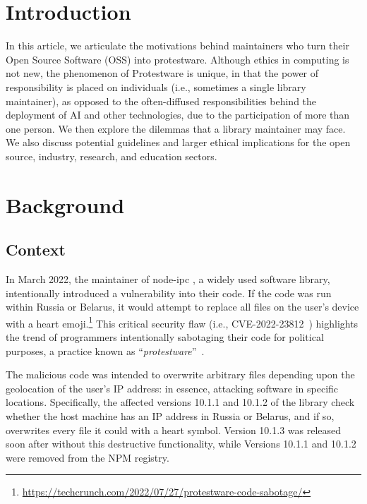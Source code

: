 \documentclass[journal,twocolumn]{IEEEtran}
\begin{document}
\section{Introduction}
In this article, we articulate the motivations behind maintainers who turn their Open Source Software (OSS) into protestware.
Although ethics in computing is not new, the phenomenon of Protestware is unique, in that the power of responsibility is placed on individuals (i.e., sometimes a single library maintainer), as opposed to the often-diffused responsibilities behind the deployment of AI and other technologies, due to the participation of more than one person.
We then explore the dilemmas that a library maintainer may face.
We also discuss potential guidelines and larger ethical implications for the open source, industry, research, and education sectors.

\section{Background}
\label{sec:background}
\subsection{Context}
\label{sec:context}

In March 2022, the maintainer of node-ipc \cite{Web:node-ipc}, a widely used software library, intentionally introduced a vulnerability into their code. If the code was run within Russia or Belarus, it would attempt to replace all files on the user's device with a heart emoji.\footnote{\url{https://techcrunch.com/2022/07/27/protestware-code-sabotage/}} This critical security flaw (i.e., CVE-2022-23812~\cite{Web:CVE-2022-23812}) highlights the trend of programmers intentionally sabotaging their code for political purposes, a practice known as ``\textit{protestware}''~\cite{kula2022war}.

The malicious code was intended to overwrite arbitrary files depending upon the geolocation of the user's IP address: in essence, attacking software in specific locations.
Specifically, the affected versions 10.1.1 and 10.1.2 of the library check whether the host machine has an IP address in Russia or Belarus, and if so, overwrites every file it could with a heart symbol. 
Version 10.1.3 was released soon after without this destructive functionality, while Versions 10.1.1 and 10.1.2 were removed from the NPM registry.
\end{document}
